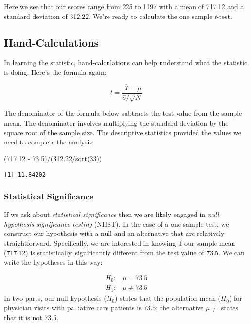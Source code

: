 \documentclass[
  11pt,
]{book}
\newenvironment{Shaded}{\begin{snugshade}}{\end{snugshade}}
\newcommand{\DecValTok}[1]{\textcolor[rgb]{0.00,0.00,0.81}{#1}}
\newcommand{\FloatTok}[1]{\textcolor[rgb]{0.00,0.00,0.81}{#1}}
\newcommand{\FunctionTok}[1]{\textcolor[rgb]{0.00,0.00,0.00}{#1}}
\newcommand{\NormalTok}[1]{#1}
\newcommand{\SpecialCharTok}[1]{\textcolor[rgb]{0.00,0.00,0.00}{#1}}
\begin{document}
Here we see that our scores range from 225 to 1197 with a mean of 717.12 and a standard deviation of 312.22. We're ready to calculate the one sample \emph{t}-test.

\hypertarget{hand-calculations}{%
\subsection{Hand-Calculations}\label{hand-calculations}}

In learning the statistic, hand-calculations can help understand what the statistic is doing. Here's the formula again:

\[
t = \frac{\bar{X} - \mu}{\hat{\sigma}/\sqrt{N} }
\]

The denominator of the formula below subtracts the test value from the sample mean. The denominator involves multiplying the standard deviation by the square root of the sample size. The descriptive statistics provided the values we need to complete the analysis:

\begin{Shaded}
\begin{Highlighting}[]
\NormalTok{(}\FloatTok{717.12} \SpecialCharTok{{-}} \FloatTok{73.5}\NormalTok{)}\SpecialCharTok{/}\NormalTok{(}\FloatTok{312.22}\SpecialCharTok{/}\FunctionTok{sqrt}\NormalTok{(}\DecValTok{33}\NormalTok{))}
\end{Highlighting}
\end{Shaded}

\begin{verbatim}
[1] 11.84202
\end{verbatim}

\hypertarget{statistical-significance}{%
\subsubsection{Statistical Significance}\label{statistical-significance}}

If we ask about \emph{statistical significance} then we are likely engaged in \emph{null hypothesis significance testing} (NHST). In the case of a one sample test, we construct our hypothesis with a null and an alternative that are relatively straightforward. Specifically, we are interested in knowing if our sample mean (717.12) is statistically, significantly different from the test value of 73.5. We can write the hypotheses in this way:

\[
\begin{array}{ll}
H_0: & \mu = 73.5 \\
H_1: & \mu \neq 73.5
\end{array}
\]
In two parts, our null hypothesis (\(H_0\)) states that the population mean (\(H_0\)) for physician visits with palliative care patients is 73.5; the alternative \(\mu \neq\) states that it is not 73.5.
\end{document}
